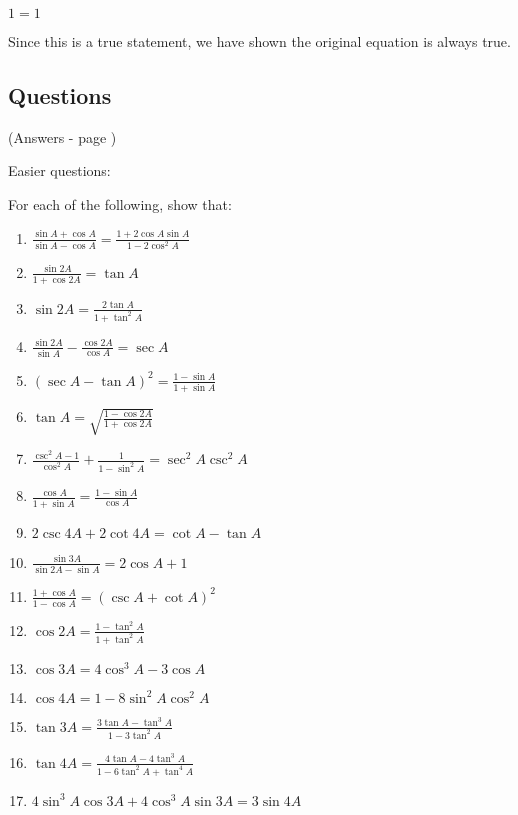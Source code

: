 \documentclass[../main.tex]{subfiles}
\begin{document}
$1=1$

Since this is a true statement, we have shown the original equation is always true.

\pagebreak

\subsection*{Questions} 
\label{Trig identities}
(Answers - page {\pageref{Trig identities answers}})

Easier questions:

For each of the following, show that:
\begin{enumerate}
    \item $\frac{\sin{A}+\cos{A}}{\sin{A}-\cos{A}}=\frac{1+2\cos{A}\sin{A}}{1-2\cos^2{A}}$
    
    \item $\frac{\sin{2A}}{1+\cos{2A}}=\tan{A}$
    
    \item $\sin{2A}=\frac{2\tan{A}}{1+\tan^2{A}}$
    
    \item $\frac{\sin{2A}}{\sin{A}}-\frac{\cos{2A}}{\cos{A}}=\sec{A}$
    
    \item $(\sec{A}-\tan{A})^2=\frac{1-\sin{A}}{1+\sin{A}}$
    
    \item $\tan{A}=\sqrt{\frac{1-\cos{2A}}{1+\cos{2A}}}$

    \item $\frac{\csc^2{A}-1}{\cos^2{A}}+\frac{1}{1-\sin^2{A}}=\sec^2{A}\csc^2{A}$
    
    \item $\frac{\cos{A}}{1+\sin{A}}=\frac{1-\sin{A}}{\cos{A}}$
    
    \item $2\csc{4A}+2\cot{4A}=\cot{A}-\tan{A}$
    
    \item $\frac{\sin{3A}}{\sin{2A}-\sin{A}}=2\cos{A}+1$
    
    \item $\frac{1+\cos{A}}{1-\cos{A}}=(\csc{A}+\cot{A})^2$
    
    \item $\cos{2A}=\frac{1-\tan^2{A}}{1+\tan^2{A}}$
    
    \item $\cos{3A}=4\cos^3{A}-3\cos{A}$
    
    \item $\cos{4A}=1-8\sin^2{A}\cos^2{A}$
    
    \item $\tan{3A}=\frac{3\tan{A}-\tan^3{A}}{1-3\tan^2{A}}$
    
    \item $\tan{4A}=\frac{4\tan{A}-4\tan^3{A}}{1-6\tan^2{A}+\tan^4{A}}$
    
    \item $4\sin^3{A}\cos{3A}+4\cos^3{A}\sin{3A}=3\sin{4A}$


\end{enumerate}
\end{document}
